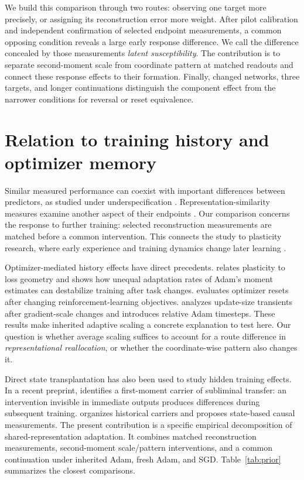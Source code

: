 We build this comparison through two routes: observing one target more precisely, or assigning its reconstruction error more weight. After pilot calibration and independent confirmation of selected endpoint measurements, a common opposing condition reveals a large early response difference. We call the difference concealed by those measurements \emph{latent susceptibility}. The contribution is to separate second-moment scale from coordinate pattern at matched readouts and connect these response effects to their formation. Finally, changed networks, three targets, and longer continuations distinguish the component effect from the narrower conditions for reversal or reset equivalence.

\section{Relation to training history and optimizer memory}
\label{sec:related}
Similar measured performance can coexist with important differences between predictors, as studied under underspecification \citep{damour2022underspecification}. Representation-similarity measures examine another aspect of their endpoints \citep{kornblith2019similarity}. Our comparison concerns the response to further training: selected reconstruction measurements are matched before a common intervention. This connects the study to plasticity research, where early experience and training dynamics change later learning \citep{achille2019critical,jastrzebski2020breakeven,dohare2024plasticity}.

Optimizer-mediated history effects have direct precedents. \citet{lyle2023plasticity} relates plasticity to loss geometry and shows how unequal adaptation rates of Adam's moment estimates can destabilize training after task changes. \citet{asadi2023resetting} evaluates optimizer resets after changing reinforcement-learning objectives. \citet{ellis2024local} analyzes update-size transients after gradient-scale changes and introduces relative Adam timesteps. These results make inherited adaptive scaling a concrete explanation to test here. Our question is whether average scaling suffices to account for a route difference in \emph{representational reallocation}, or whether the coordinate-wise pattern also changes it.

Direct state transplantation has also been used to study hidden training effects. In a recent preprint, \citet{xu2026optimizer} identifies a first-moment carrier of subliminal transfer: an intervention invisible in immediate outputs produces differences during subsequent training. \citet{sevetlidis2026trainingmemory} organizes historical carriers and proposes state-based causal measurements. The present contribution is a specific empirical decomposition of shared-representation adaptation. It combines matched reconstruction measurements, second-moment scale/pattern interventions, and a common continuation under inherited Adam, fresh Adam, and SGD. Table~\ref{tab:prior} summarizes the closest comparisons.

